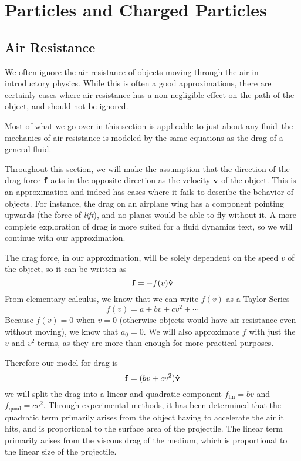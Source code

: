 \chapter{Particles and Charged Particles}
\section{Air Resistance} \label{drag1}
We often ignore the air resistance of objects moving through the air in introductory physics. While this is often a good approximations, there are certainly cases where air resistance has a non-negligible effect on the path of the object, and should not be ignored.

Most of what we go over in this section is applicable to just about any fluid--the mechanics of air resistance is modeled by the same equations as the drag of a general fluid. 

Throughout this section, we will make the assumption that the direction of the drag force $\mathbf{f}$ acts in the opposite direction as the velocity $\mathbf{v}$ of the object. This is an approximation and indeed has cases where it fails to describe the behavior of objects. For instance, the drag on an airplane wing has a component pointing upwards (the force of \textit{lift}), and no planes would be able to fly without it. A more complete exploration of drag is more suited for a fluid dynamics text, so we will continue with our approximation.

The drag force, in our approximation, will be solely dependent on the speed $v$ of the object, so it can be written as
\[ \mathbf{f} = -f(v)\mathbf{\hat v} \]
From elementary calculus, we know that we can write $f(v)$ as a Taylor Series
\[ f(v) = a + bv + cv^2 + \cdots \]
Because $f(v) = 0$ when $v=0$ (otherwise objects would have air resistance even without moving), we know that $a_0 = 0$. We will also approximate $f$ with just the $v$ and $v^2$ terms, as they are more than enough for more practical purposes. 

Therefore our model for drag is 
\[ \mathbf{f} = (bv + cv^2)\mathbf{\hat v}\]
we will split the drag into a linear and quadratic component $f_{\text{lin}} = bv$ and $f_{\text{quad}} = cv^2$. Through experimental methods, it has been determined that the quadratic term primarily arises from the object having to accelerate the air it hits, and is proportional to the surface area of the projectile. The linear term primarily arises from the viscous drag of the medium, which is proportional to the linear size of the projectile. 


